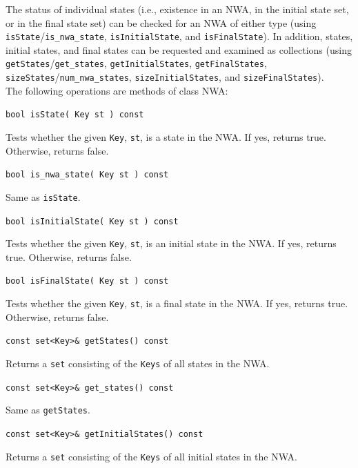 \documentclass{llncs}
\begin{document}
The status of individual states (i.e., existence in an NWA, in the initial state set, or in the final state set) can be checked for an NWA of either type (using \texttt{isState}/\texttt{is\_nwa\_state}, \texttt{isInitialState}, and \texttt{isFinalState}).  In addition, states, initial states, and final states can be requested and examined as collections (using \texttt{getStates}/\texttt{get\_states}, \texttt{getInitialStates}, \texttt{getFinalStates}, \texttt{sizeStates}/\texttt{num\_nwa\_states}, \texttt{sizeInitialStates}, and \texttt{sizeFinalStates}). \\

\noindent The following operations are methods of class NWA:

\begin{description}

  \item\texttt{bool isState( Key st ) const}

    Tests whether the given \texttt{Key}, \texttt{st}, is a state in the NWA.  If yes, returns true.  Otherwise, returns false.

  \item\texttt{bool is\_nwa\_state( Key st ) const}

    Same as \texttt{isState}.

  \item\texttt{bool isInitialState( Key st ) const}

    Tests whether the given \texttt{Key}, \texttt{st}, is an initial state in the NWA.  If yes, returns true.  Otherwise, returns false.

  \item\texttt{bool isFinalState( Key st ) const}

    Tests whether the given \texttt{Key}, \texttt{st}, is a final state in the NWA.  If yes, returns true.  Otherwise, returns false.

  \item\texttt{const set<Key>\& getStates() const}

    Returns a \texttt{set} consisting of the \texttt{Keys} of all states in the NWA.

  \item\texttt{const set<Key>\& get\_states() const}

    Same as \texttt{getStates}.

  \item\texttt{const set<Key>\& getInitialStates() const}

    Returns a \texttt{set} consisting of the \texttt{Keys} of all initial states in the NWA.


\end{description}
\end{document}
